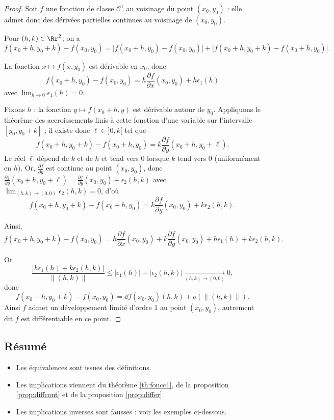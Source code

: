 \begin{proof}
	Soit $f$ une fonction de classe $\mathcal{C}^1$ au voisinage du point $(x_0,y_0)$ : elle admet donc des dérivées partielles continues au voisinage de $(x_0,y_0)$. 
	
	
	Pour $(h,k)\in \Rr^2$, on a
	$$f(x_0+h,y_0+k)-f(x_0,y_0)=\big[f(x_0+h,y_0)-f(x_0,y_0)\big]
	+\big[f(x_0+h,y_0+k)-f(x_0+h,y_0)\big].$$
	
	La fonction $x\mapsto f(x,y_0)$ est dérivable en $x_0$, donc $$f(x_0+h,y_0)-f(x_0,y_0)=h\frac{\partial f}{\partial x}(x_0,y_0)+ h\epsilon_1(h)$$
	avec $\lim _{h\to 0}\epsilon _1(h)=0$.
	
	Fixons $h$ : la fonction $y\mapsto f(x_0+h,y)$ est dérivable autour de $y_0$. Appliquons le théorème des accroissements finis à cette fonction d'une variable sur l'intervalle $[y_0,y_0+k]$ ; il existe donc $\ell \in {}]0,k[$ tel que 
	$$f(x_0+h,y_0+k)-f(x_0+h,y_0) = k \frac{\partial f}{\partial y}(x_0+h,y_0+\ell).$$
	Le réel $\ell$ dépend de $k$ et de $h$ et tend vers $0$ lorsque $k$ tend vers $0$ (uniformément en $h$).
	Or, $\frac{\partial f}{\partial y}$ est continue au point $(x_0,y_0)$, donc $\frac{\partial f}{\partial y}(x_0+h,y_0+\ell)=\frac{\partial f}{\partial y}(x_0,y_0)+\epsilon_2(h,k)$ avec $\lim _{(h,k)\to (0,0)}\epsilon_2(h,k)=0$,
	d'où
	$$f(x_0+h,y_0+k)-f(x_0+h,y_0)=k\frac{\partial f}{\partial y}(x_0,y_0)+k\epsilon _2(h,k).$$
	
	Ainsi, 
	$$f(x_0+h,y_0+k)-f(x_0,y_0)=h\frac{\partial f}{\partial x}(x_0,y_0)+k\frac{\partial f}{\partial y}(x_0,y_0)+h\epsilon _1(h)+k\epsilon _2(h,k).$$
	
	Or
	$$\frac{|h\epsilon _1(h)+k\epsilon _2(h,k)|}{\|(h,k)\|}\le |\epsilon _1(h)|+|\epsilon _2(h,k)| \xrightarrow[(h,k)\to(0,0)]{} 0,$$
	donc
	$$f(x_0+h,y_0+k)-f(x_0,y_0)=\dd f (x_0,y_0)(h,k)+o\left(\|(h,k)\|\right).$$
	Ainsi $f$ admet un développement limité d'ordre $1$ au point $(x_0,y_0)$, autrement dit $f$ est différentiable en ce point.
\end{proof}



\subsection{Résumé}



\begin{itemize}
	\item Les équivalences sont issues des définitions.
	\item Les implications viennent du théorème \ref{th:foncc1}, de la proposition \ref{prop:diffcont} et de la proposition \ref{prop:differ}.
	\item Les implications inverses sont fausses : voir les exemples ci-dessous.
\end{itemize}



